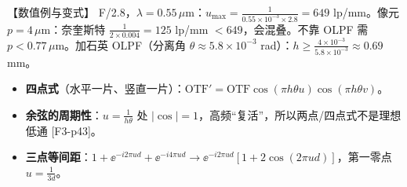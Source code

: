\begin{exam}{【数值例与变式】}
F/2.8，$\lambda=0.55\,\mu$m：$u_{\max}=\frac{1}{0.55\times10^{-3}\times2.8}=649$ lp/mm。像元 $p=4\,\mu$m：奈奎斯特 $\frac{1}{2\times0.004}=125$ lp/mm $<649$，会混叠。不靠 OLPF 需 $p<0.77\,\mu$m。加石英 OLPF（分离角 $\theta\approx5.8\times10^{-3}$ rad）：$h\ge\frac{4\times10^{-3}}{5.8\times10^{-3}}\approx0.69$ mm。
\begin{itemize}
\item \textbf{四点式}（水平一片、竖直一片）：$\mathrm{OTF}'=\mathrm{OTF}\cos(\pi h\theta u)\cos(\pi h\theta v)$。
\item \textbf{余弦的周期性}：$u=\frac{1}{h\theta}$ 处 $|\cos|=1$，高频“复活”，所以两点/四点式不是理想低通 [F3-p43]。
\item \textbf{三点等间距}：$1+\ee^{-i2\pi ud}+\ee^{-i4\pi ud}\to\ee^{-i2\pi ud}[1+2\cos(2\pi ud)]$，第一零点 $u=\frac{1}{3d}$。
\end{itemize}
\end{exam}

